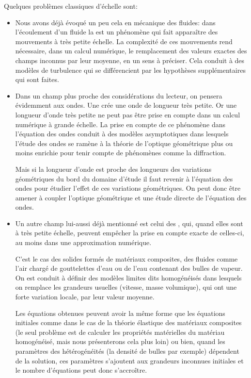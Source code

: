 Quelques problèmes classiques d'échelle sont:
\begin{itemize}
  \item Nous avons déjà évoqué un peu cela en mécanique des fluides:
	dans l'écoulement d'un fluide la  est un phénomène qui fait apparaître
	des mouvements à très petite échelle. La complexité de ces mouvements rend nécessaire,
	dans un calcul numérique, le remplacement des valeurs exactes des champs inconnus par leur
	moyenne, en un sens à préciser. Cela conduit à des modèles de turbulence qui se
	différencient par les hypothèses supplémentaires qui sont faites.
  \item Dans un champ plus proche des considérations du lecteur, on pensera évidemment
	aux ondes.
	Une  crée une onde de longueur très petite.
	Or une longueur d'onde très petite ne peut pas être prise en compte dans un calcul
	numérique à grande échelle. La prise en compte de ce phénomène dans l'équation
	des ondes conduit à des modèles asymptotiques dans lesquels l'étude des ondes se
	ramène à la théorie de l'optique géométrique plus ou moins enrichie pour tenir
	compte de phénomènes comme la diffraction.

	Mais si la longueur d'onde est proche des longueurs des variations géométriques
	du bord du domaine d'étude il faut revenir à l'équation des ondes pour étudier
	l'effet de ces variations géométriques. On peut donc être amener à coupler
	l'optique géométrique et une étude directe de l'équation des ondes.
  \item Un autre champ lui-aussi déjà mentionné est celui des , qui, quand elles sont à très petite échelle, peuvent empêcher
	la prise en compte exacte de celles-ci, au moins dans une approximation numérique.

	C'est le cas des solides formés de matériaux composites, des fluides comme l'air
	chargé de gouttelettes d'eau ou de l'eau contenant des bulles de vapeur.
	On est conduit à définir des modèles limites dits homogénéisés
	dans lesquels on remplace les grandeurs usuelles (vitesse, masse volumique), qui ont une forte
	variation locale, par leur valeur moyenne.

	Les équations obtenues peuvent avoir la même forme que les équations initiales
	comme dans le cas de la théorie élastique des matériaux composites (le seul
	problème est de calculer les propriétés matérielles du matériau homogénéisé,
	mais nous présenterons cela plus loin) ou bien, quand les paramètres des
	hétérogénéités (la densité de bulles par exemple) dépendent de la solution,
	ces paramètres s'ajoutent aux grandeurs inconnues initiales et le nombre d'équations
	peut donc s'accroître.
\end{itemize}

